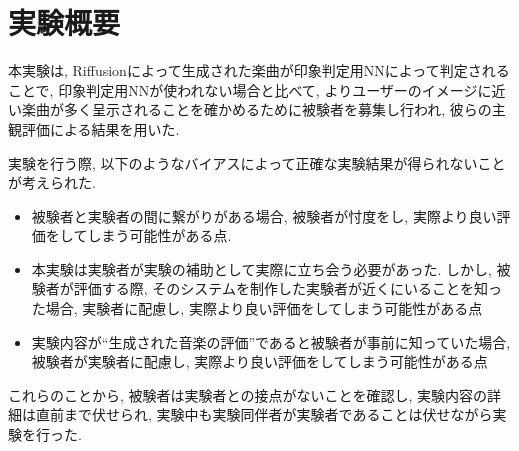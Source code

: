 \documentclass[a4paper,11pt,dvipdfmx]{jreport}
\begin{document}
\section{実験概要}
本実験は, Riffusionによって生成された楽曲が印象判定用NNによって判定されることで, 印象判定用NNが使われない場合と比べて, よりユーザーのイメージに近い楽曲が多く呈示されることを確かめるために被験者を募集し行われ, 彼らの主観評価による結果を用いた.

実験を行う際, 以下のようなバイアスによって正確な実験結果が得られないことが考えられた.
\begin{itemize}
  \item 被験者と実験者の間に繋がりがある場合, 被験者が忖度をし, 実際より良い評価をしてしまう可能性がある点.
  \item 本実験は実験者が実験の補助として実際に立ち会う必要があった. 
        しかし, 被験者が評価する際, そのシステムを制作した実験者が近くにいることを知った場合, 
        実験者に配慮し, 実際より良い評価をしてしまう可能性がある点
  \item 実験内容が``生成された音楽の評価''であると被験者が事前に知っていた場合,
        被験者が実験者に配慮し, 実際より良い評価をしてしまう可能性がある点
\end{itemize}
これらのことから, 被験者は実験者との接点がないことを確認し, 実験内容の詳細は直前まで伏せられ, 
実験中も実験同伴者が実験者であることは伏せながら実験を行った.
\end{document}
